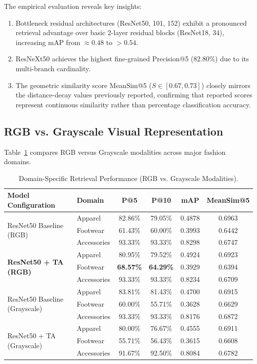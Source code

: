 \documentclass[runningheads]{llncs}
\begin{document}
The empirical evaluation reveals key insights:
\begin{enumerate}
    \item Bottleneck residual architectures (ResNet50, 101, 152) exhibit a pronounced retrieval advantage over basic 2-layer residual blocks (ResNet18, 34), increasing mAP from $\approx 0.48$ to $>0.54$.
    \item ResNeXt50 achieves the highest fine-grained Precision@5 (82.80\%) due to its multi-branch cardinality.
    \item The geometric similarity score MeanSim@5 ($S \in [0.67, 0.73]$) closely mirrors the distance-decay values previously reported, confirming that reported scores represent continuous similarity rather than percentage classification accuracy.
\end{enumerate}

\subsection{RGB vs. Grayscale Visual Representation}
Table~\ref{tab:categories} compares RGB versus Grayscale modalities across major fashion domains.

\begin{table}[t]
\centering
\caption{Domain-Specific Retrieval Performance (RGB vs. Grayscale Modalities).}
\label{tab:categories}
\begin{tabular}{llcccc}
\toprule
\textbf{Model Configuration} & \textbf{Domain} & \textbf{P@5} & \textbf{P@10} & \textbf{mAP} & \textbf{MeanSim@5} \\
\midrule
\multirow{3}{*}{ResNet50 Baseline (RGB)} 
    & Apparel     & 82.86\% & 79.05\% & 0.4878 & 0.6963 \\
    & Footwear    & 61.43\% & 60.00\% & 0.3993 & 0.6442 \\
    & Accessories & 93.33\% & 93.33\% & 0.8298 & 0.6747 \\
\midrule
\multirow{3}{*}{\textbf{ResNet50 + TA (RGB)}} 
    & Apparel     & 80.95\% & 79.52\% & 0.4924 & 0.6923 \\
    & Footwear    & \textbf{68.57\%} & \textbf{64.29\%} & 0.3929 & 0.6394 \\
    & Accessories & 93.33\% & 93.33\% & 0.8234 & 0.6709 \\
\midrule
\multirow{3}{*}{ResNet50 Baseline (Grayscale)} 
    & Apparel     & 83.81\% & 81.43\% & 0.4700 & 0.6915 \\
    & Footwear    & 60.00\% & 55.71\% & 0.3628 & 0.6629 \\
    & Accessories & 93.33\% & 93.33\% & 0.8176 & 0.6872 \\
\midrule
\multirow{3}{*}{ResNet50 + TA (Grayscale)} 
    & Apparel     & 80.00\% & 76.67\% & 0.4555 & 0.6911 \\
    & Footwear    & 55.71\% & 56.43\% & 0.3615 & 0.6608 \\
    & Accessories & 91.67\% & 92.50\% & 0.8084 & 0.6782 \\
\bottomrule
\end{tabular}
\end{table}
\end{document}
